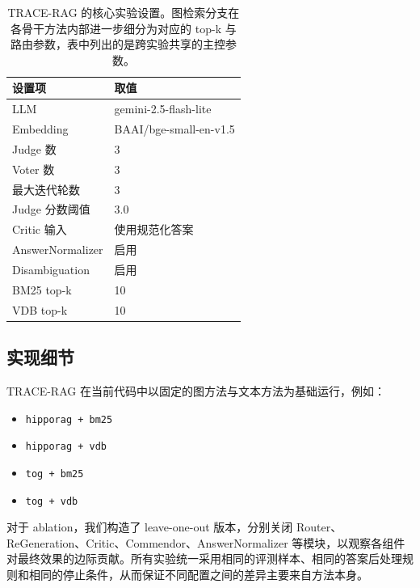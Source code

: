 ﻿\documentclass[UTF8,11pt,twocolumn]{ctexart}
\begin{document}
\begin{table}[t]
\centering
\small
\begin{tabular}{ll}
\toprule
设置项 & 取值 \\
\midrule
LLM & gemini-2.5-flash-lite \\
Embedding & BAAI/bge-small-en-v1.5 \\
Judge 数 & 3 \\
Voter 数 & 3 \\
最大迭代轮数 & 3 \\
Judge 分数阈值 & 3.0 \\
Critic 输入 & 使用规范化答案 \\
AnswerNormalizer & 启用 \\
Disambiguation & 启用 \\
BM25 top-k & 10 \\
VDB top-k & 10 \\
\bottomrule
\end{tabular}
\caption{TRACE-RAG 的核心实验设置。图检索分支在各骨干方法内部进一步细分为对应的 top-k 与路由参数，表中列出的是跨实验共享的主控参数。}
\label{tab:system-settings}
\end{table}

\subsection{实现细节}

TRACE-RAG 在当前代码中以固定的图方法与文本方法为基础运行，例如：
\begin{itemize}[leftmargin=1.5em]
  \item \texttt{hipporag + bm25}
  \item \texttt{hipporag + vdb}
  \item \texttt{tog + bm25}
  \item \texttt{tog + vdb}
\end{itemize}
对于 ablation，我们构造了 leave-one-out 版本，分别关闭 Router、ReGeneration、Critic、Commendor、AnswerNormalizer 等模块，以观察各组件对最终效果的边际贡献。所有实验统一采用相同的评测样本、相同的答案后处理规则和相同的停止条件，从而保证不同配置之间的差异主要来自方法本身。
\end{document}
